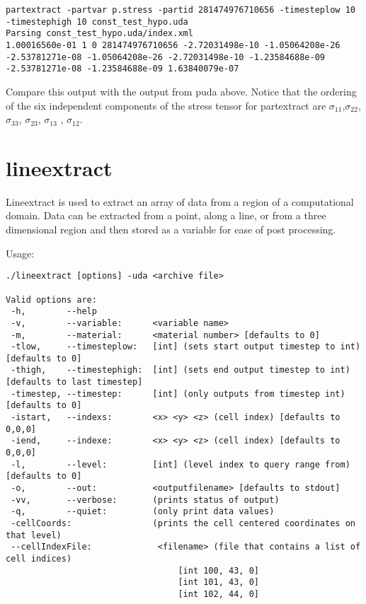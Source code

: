 \begin{Verbatim}[fontsize=\footnotesize]
partextract -partvar p.stress -partid 281474976710656 -timesteplow 10 -timestephigh 10 const_test_hypo.uda
Parsing const_test_hypo.uda/index.xml
1.00016560e-01 1 0 281474976710656 -2.72031498e-10 -1.05064208e-26 -2.53781271e-08 -1.05064208e-26 -2.72031498e-10 -1.23584688e-09 -2.53781271e-08 -1.23584688e-09 1.63840079e-07
\end{Verbatim}

Compare this output with the output from puda above.  Notice that the ordering of the six independent components of the stress tensor for partextract are $\sigma_{11}$,$\sigma_{22}$, $\sigma_{33}$, $\sigma_{23}$, $\sigma_{13}$ , $\sigma_{12}$.

\section{lineextract}

Lineextract is used to extract an array of data from a region of a computational domain. Data can be extracted from a point, along a line, or from a three dimensional region and then stored as a variable for ease of post processing.

Usage: \begin{Verbatim}[fontsize=\footnotesize]
./lineextract [options] -uda <archive file>

Valid options are:
 -h,        --help
 -v,        --variable:      <variable name>
 -m,        --material:      <material number> [defaults to 0]
 -tlow,     --timesteplow:   [int] (sets start output timestep to int) [defaults to 0]
 -thigh,    --timestephigh:  [int] (sets end output timestep to int) [defaults to last timestep]
 -timestep, --timestep:      [int] (only outputs from timestep int) [defaults to 0]
 -istart,   --indexs:        <x> <y> <z> (cell index) [defaults to 0,0,0]
 -iend,     --indexe:        <x> <y> <z> (cell index) [defaults to 0,0,0]
 -l,        --level:         [int] (level index to query range from) [defaults to 0]
 -o,        --out:           <outputfilename> [defaults to stdout]
 -vv,       --verbose:       (prints status of output)
 -q,        --quiet:         (only print data values)
 -cellCoords:                (prints the cell centered coordinates on that level)
 --cellIndexFile:             <filename> (file that contains a list of cell indices)
                                  [int 100, 43, 0]
                                  [int 101, 43, 0]
                                  [int 102, 44, 0]
\end{Verbatim}


